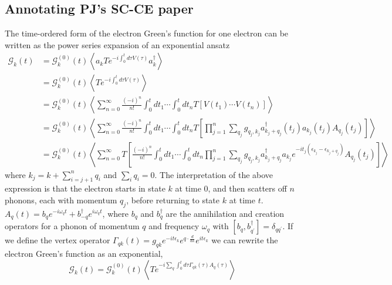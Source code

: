 \subsection{Annotating PJ's SC-CE paper}
\label{sec:pj_ce}
 The time-ordered form of the electron Green's function for one electron can be written as the power series expansion of an exponential ansatz
\begin{align}
\mathcal{G}_k(t)&=\mathcal{G}_k^{(0)}(t)\left\langle a_k T e^{-i \int_0^t d \tau V({\tau})} a_k^\dag\right\rangle
\label{6.5}\\
&=\mathcal{G}_k^{(0)}(t)\left\langle T e^{-i \int_0^t d \tau V({\tau})}\right\rangle \\
&=\mathcal{G}_k^{(0)}(t) \left\langle \sum_{n=0}^{\infty} \frac{(-i)^n}{n!} \int_0^t d t_1 \cdots \int_0^t d t_n T\left[V ( t _ { 1 } ) \cdots V \left(t_n\right)\right] \right\rangle \\
&=\mathcal{G}_k^{(0)}(t) \left\langle \sum_{n=0}^{\infty} \frac{(-i)^n}{n!} \int_0^t d t_1 \cdots \int_0^t d t_n T\left[\prod_{j=1}^n \sum_{q_j} g_{q_j, k_j} a_{k_j+q_j}^{\dagger}\left(t_j\right) a_{k_j}\left(t_j\right) A_{q_j}\left(t_j\right)\right] \right\rangle \\
&=\mathcal{G}_k^{(0)}(t) \left\langle \sum_{n=0}^{\infty} T \left[\frac{(-i)^n}{n!} \int_0^t d t_1 \cdots \int_0^t d t_n \prod_{j=1}^n \sum_{q_j} g_{q_j, k_j} a_{k_j+q_j}^{\dagger} a_{k_j}e^{-it_j(\epsilon_{k_j}-\epsilon_{k_j + q_j})} A_{q_j}\left(t_j\right)\right] \right\rangle 
\end{align}
where $k_j = k + \sum_{i=j+1}^n q_i$ and $\sum_i q_i=0$. The interpretation of the above expression is that the electron starts in state $k$ at time $0$, and then scatters off $n$ phonons, each with momentum $q_j$, before returning to state $k$ at time $t$. $A_q(t)=b_q e^{-i \omega_q t}+b_{-q}^\dagger e^{i \omega_q t}$, where $b_q$ and $b_q^\dagger$ are the annihilation and creation operators for a phonon of momentum $q$ and frequency $\omega_q$ with $[b_q, b_{q^{\prime}}^{\dagger}]=\delta_{q q^{\prime}}$. If we define the vertex operator $\Gamma_{q k}(t)=g_{q k} e^{-i t \epsilon_k} e^{q \cdot \frac{d}{d k}} e^{i t \epsilon_k}$ we can rewrite the electron Green's function as an exponential,
\begin{equation}
\mathcal{G}_k(t)=\mathcal{G}_k^{(0)}(t)\left\langle T e^{-i \sum_q \int_0^t d \tau \Gamma_{q k}(\tau) A_q(\tau)}\right\rangle
\end{equation}
